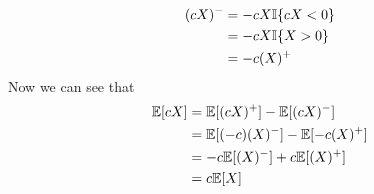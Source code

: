\begin{enumerate}
\begin{enumerate}
\begin{align}
            (cX)^-&=-cX\mathbb{I}\{cX<0 \}\notag\\
            &=-cX\mathbb{I}\{X>0 \}\notag\\
            &=-c(X)^+\notag
        \end{align}
        Now we can see that
        \begin{align}
            \mathbb{E}[cX]&=\mathbb{E}[(cX)^+]-\mathbb{E}[(cX)^-]\notag\\
            &=\mathbb{E}[(-c)(X)^-]-\mathbb{E}[-c(X)^+]\notag\\
            &=-c\mathbb{E}[(X)^-]+c\mathbb{E}[(X)^+]\notag\\
            &=c\mathbb{E}[X]\notag
        \end{align}
\end{enumerate}
\end{enumerate}


